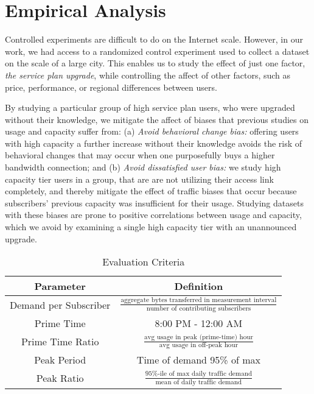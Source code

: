 \section{Empirical Analysis}\label{sec:analysis}


Controlled experiments are difficult to do on the Internet scale. However, in 
our work, we had access to a randomized control experiment used to collect a 
dataset on the scale of a large city. This enables us to study the effect of 
just one factor, \emph{the service plan upgrade}, while controlling the affect 
of other factors, such as price, performance, or regional differences between 
users.

By studying a particular group of high service plan users, who were 
upgraded without their knowledge, we mitigate the affect of biases that 
previous studies on usage and capacity suffer from: (a) \emph{Avoid behavioral 
change bias:} offering users with high capacity a further increase without 
their knowledge avoids the risk of behavioral changes that may occur when one 
purposefully buys a higher bandwidth connection; and (b) \emph{Avoid 
dissatisfied user bias:} we study high capacity tier users in a \control{} 
group, that are are not utilizing their access link completely, and thereby 
mitigate the effect of traffic biases that occur because subscribers' previous 
capacity was insufficient for their usage. Studying datasets with these biases 
are prone to positive correlations between usage and capacity, which we 
avoid by examining a single high capacity tier with an unannounced upgrade.

\begin{table}[ht]
\small 
\begin{tabular}{| c | c |}\hline
\textbf{Parameter} & \textbf{Definition}	\\\hline
Demand per Subscriber& \(\frac{\text{aggregate bytes transferred in 
measurement interval}}{\text{number of contributing subscribers}}\)	\\
Prime Time		& 8:00 PM - 12:00 AM   		\\
Prime Time Ratio 	& \( \frac{ \text{avg usage in peak (prime-time) 
hour}}{ \text{avg usage in off-peak hour}}\) 		\\
Peak Period		& Time of demand 95\% of max    \\
Peak Ratio 		& \(\frac{\text{95\%-ile of max daily 
traffic demand}}{\text{mean of daily traffic demand}}\)	\\\hline
\end{tabular}
\caption{Evaluation Criteria}
\label{tab:eval-criteria}
\end{table}


